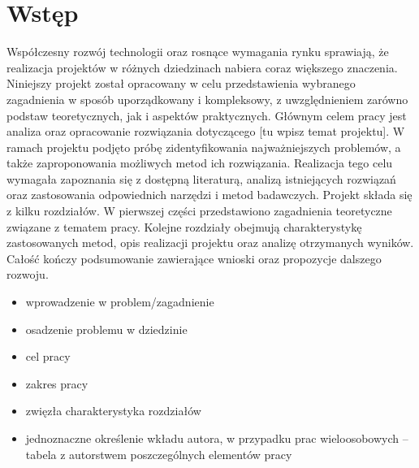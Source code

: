 \chapter{Wstęp}
\label{ch:wstep}

Współczesny rozwój technologii oraz rosnące wymagania rynku sprawiają, że realizacja projektów w różnych dziedzinach nabiera coraz większego znaczenia. Niniejszy projekt został opracowany w celu przedstawienia wybranego zagadnienia w sposób uporządkowany i kompleksowy, z uwzględnieniem zarówno podstaw teoretycznych, jak i aspektów praktycznych.
Głównym celem pracy jest analiza oraz opracowanie rozwiązania dotyczącego [tu wpisz temat projektu]. W ramach projektu podjęto próbę zidentyfikowania najważniejszych problemów, a także zaproponowania możliwych metod ich rozwiązania. Realizacja tego celu wymagała zapoznania się z dostępną literaturą, analizą istniejących rozwiązań oraz zastosowania odpowiednich narzędzi i metod badawczych.
Projekt składa się z kilku rozdziałów. W pierwszej części przedstawiono zagadnienia teoretyczne związane z tematem pracy. Kolejne rozdziały obejmują charakterystykę zastosowanych metod, opis realizacji projektu oraz analizę otrzymanych wyników. Całość kończy podsumowanie zawierające wnioski oraz propozycje dalszego rozwoju.

\begin{itemize}
\item wprowadzenie w problem/zagadnienie
\item osadzenie problemu w dziedzinie
\item cel pracy
\item zakres pracy
\item zwięzła charakterystyka rozdziałów
\item jednoznaczne określenie wkładu autora, w przypadku prac wieloosobowych – tabela z autorstwem poszczególnych elementów pracy
\end{itemize}

